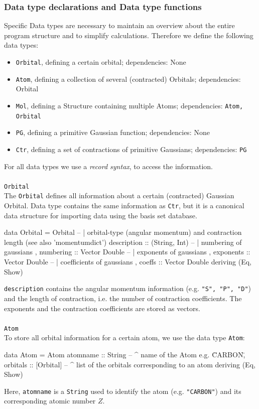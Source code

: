 \documentclass[twoside,        %
			   11pt,			%
               BCOR10mm,       %
               ngerman,english  %
               ]{scrartcl}
\begin{document}
\subsubsection{Data type declarations and Data type functions}
Specific Data types are necessary to maintain an overview about the entire program structure and to simplify calculations. Therefore we define the following data types:
\begin{itemize}
\item \texttt{Orbital}, defining a certain orbital; dependencies: None
\item \texttt{Atom}, defining a collection of several (contracted) Orbitals; dependencies: Orbital
\item \texttt{Mol}, defining a Structure containing multiple Atoms; dependencies: \texttt{Atom, Orbital}
\item \texttt{PG}, defining a primitive Gaussian function; dependencies: None
\item \texttt{Ctr}, defining a set of contractions of primitive Gaussians; dependencies: \texttt{PG}
\end{itemize}
For all data types we use a \emph{record syntax}, to access the information. \\ \\

\large{\texttt{Orbital}}\\
The \texttt{Orbital} defines all information about a certain (contracted) Gaussian Orbital. Data type contains the same information as \texttt{Ctr}, but it is a canonical data structure for importing data using the basis set database. 
\begin{code}
data Orbital = Orbital { 
			-- | orbital-type (angular momentum) and contraction length  (see also 'momentumdict') 
			description :: (String, Int)
			-- | numbering of gaussians
			, numbering :: Vector Double
			-- | exponents of gaussians  
		 	, exponents :: Vector Double
			-- | coefficients of gaussians  
			, coeffs :: Vector Double  
			} deriving (Eq, Show)
\end{code} \texttt{description} contains the angular momentum information (e.g. \texttt{"S", "P", "D"}) and the length of contraction, i.e. the number of contraction coefficients. The exponents and the contraction coefficients are stored as vectors. \\ \\

\large{\texttt{Atom}}\\
To store all orbital information for a certain atom, we use the data type \texttt{Atom}:
\begin{code}
data Atom = Atom {atomname :: String	-- ^ name of the Atom e.g. \"CARBON\"  
		, orbitals :: [Orbital] -- ^ list of the orbitals corresponding to an atom   
		 } deriving (Eq, Show)
\end{code}Here, \texttt{atomname} is a \texttt{String} used to identify the atom (e.g. \texttt{"CARBON"}) and its corresponding atomic number $Z$. \\ \\
\end{document}
